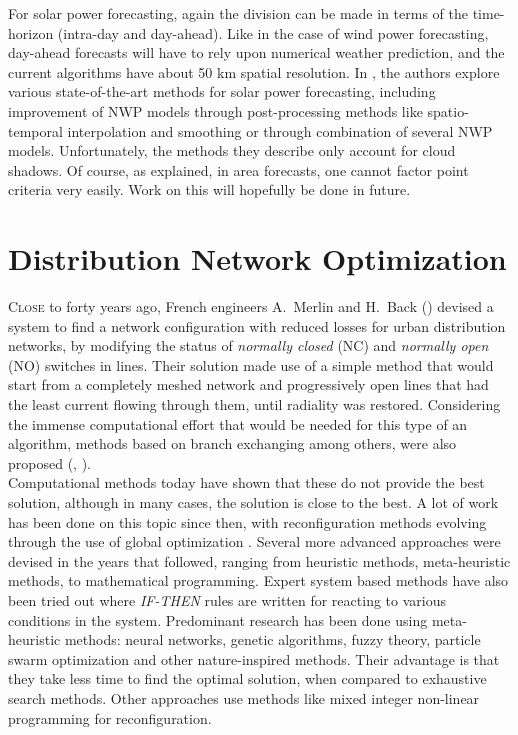 For solar power forecasting, again the division can be made in terms of the time-horizon (intra-day and day-ahead). Like in the case of wind power forecasting, day-ahead forecasts will have to rely upon numerical weather prediction, and the current algorithms have about 50 km spatial resolution. In \cite{PVPS2013}, the authors explore various state-of-the-art methods for solar power forecasting, including improvement of NWP models through post-processing methods like spatio-temporal interpolation and smoothing or through combination of several NWP models. Unfortunately, the methods they describe only account for cloud shadows. Of course, as explained, in area forecasts, one cannot factor point criteria very easily. Work on this will hopefully be done in future.

\section{Distribution Network Optimization}

\lettrine{C}{lose} to forty years ago, French engineers A.\ Merlin and H.\ Back (\cite{MandB75}) devised a system to find a network configuration with reduced losses for urban distribution networks, by modifying the status of \emph{normally closed} (NC) and \emph{normally open} (NO) switches in lines. Their solution made use of a simple method that would start from a completely meshed network and progressively open lines that had the least current flowing through them, until radiality was restored. Considering the immense computational effort that would be needed for this type of an algorithm, methods based on branch exchanging among others, were also proposed (\cite{CinGra88}, \cite{ShiHon89}).\\

Computational methods today have shown that these do not provide the best solution, although in many cases, the solution is close to the best. A lot of work has been done on this topic since then, with reconfiguration methods evolving through the use of global optimization \cite{CavLyra97}. Several more advanced approaches were devised in the years that followed, ranging from heuristic methods, meta-heuristic methods, to mathematical programming. Expert system based methods have also been tried out where \emph{IF-THEN} rules are written for reacting to various conditions in the system. Predominant research has been done using meta-heuristic methods: neural networks, genetic algorithms, fuzzy theory, particle swarm optimization and other nature-inspired methods. Their advantage is that they take less time to find the optimal solution, when compared to exhaustive search methods. Other approaches use methods like mixed integer non-linear programming for reconfiguration.\\

